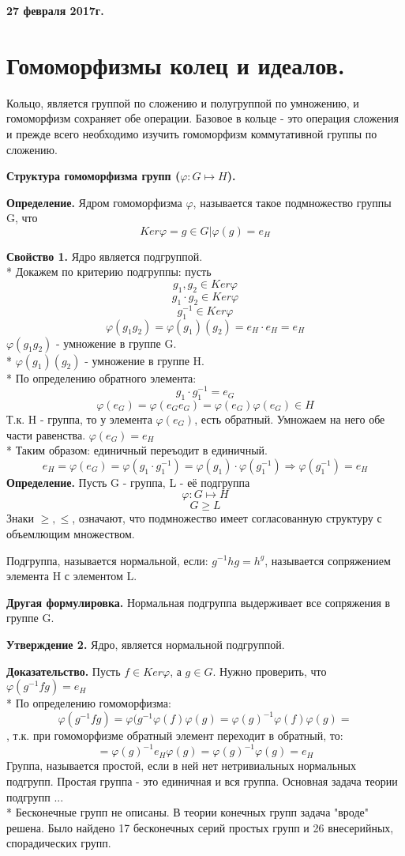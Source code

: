 \documentclass{article}
\begin{document}
\textbf {27 февраля 2017г.}
\section*{Гомоморфизмы колец и идеалов.} 
Кольцо, является группой по сложению и полугруппой по умножению, и гомоморфизм сохраняет обе операции. Базовое в кольце - это операция сложения и прежде всего необходимо изучить гомоморфизм коммутативной группы по сложению.

{\bf Структура гомоморфизма групп ($\varphi:G\mapsto H$).}

{\bf Определение.} Ядром гомоморфизма $\varphi$, называется такое подмножество группы G, что $$Ker\varphi={g\in G| \varphi(g)=e_H}$$

{\bf Свойство 1.} Ядро является подгруппой.\\*
Докажем по критерию подгруппы: пусть $$g_1,g_2\in Ker\varphi$$
$$g_1\cdot g_2\in Ker\varphi$$
$$g^{-1}_1 \in Ker\varphi$$
$$\varphi(g_1g_2)=\varphi(g_1)(g_2)=e_H\cdot e_H=e_H$$
$\varphi(g_1g_2)$ - умножение в группе G.\\*
$\varphi(g_1)(g_2)$ - умножение в группе H.\\*
По определению обратного элемента: $$g_1\cdot g^{-1}_1=e_G$$
$$\varphi(e_G)=\varphi(e_Ge_G)=\varphi(e_G)\varphi(e_G) \in H$$
Т.к. H - группа, то у элемента $\varphi(e_G)$, есть обратный. Умножаем на него обе части равенства. $\varphi(e_G)=e_H$\\*
Таким образом: единичный переъодит в единичный.
$$e_H=\varphi(e_G)=\varphi(g_1\cdot g^{-1}_1)=\varphi(g_1)\cdot\varphi(g^{-1}_1)\Rightarrow\varphi(g^{-1}_1)=e_H$$
{\bf Определение.} Пусть G - группа, L - её подгруппа $$\varphi:G\mapsto H$$
$$G\ge L$$
Знаки $\ge,\le$, означают, что подмножество имеет согласованную структуру с объемлющим множеством.

Подгруппа, называется нормальной, если: $g^{-1}hg=h^g$, называется сопряжением элемента H с элементом L.

{\bf Другая формулировка.} Нормальная подгруппа выдерживает все сопряжения в группе G.

{\bf Утверждение 2.} Ядро, является нормальной подгруппой.

{\bf Доказательство.} Пусть $f\in Ker\varphi$, а $g\in G$.
Нужно проверить, что $\varphi(g^{-1}fg)=e_H$\\*
По определению гомоморфизма: $$\varphi(g^{-1}fg)=\varphi(g^{-1}\varphi(f)\varphi(g)=\varphi(g)^{-1}\varphi(f)\varphi(g)=$$, т.к. при гомоморфизме обратный элемент переходит в обратный, то: $$=\varphi(g)^{-1}e_H\varphi(g)=\varphi(g)^{-1}\varphi(g)=e_H$$
Группа, называется простой, если в ней нет нетривиальных нормальных подгрупп. Простая группа - это единичная и вся группа. Основная задача теории подгрупп ...\\*
Бесконечные групп не описаны. В теории конечных групп задача "вроде" решена. Было найдено 17 бесконечных серий простых групп и 26 внесерийных, спорадических групп.
\end{document}
